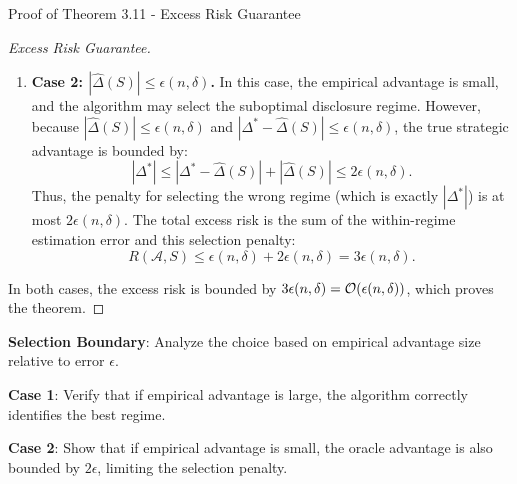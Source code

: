 \begin{sourceblock}{Proof of Theorem 3.11 - Excess Risk Guarantee}
\begin{proof}[Excess Risk Guarantee]
\begin{enumerate}
    \begin{equation}
        R(\mathcal{A}, S) \le \epsilon(n, \delta).
    \end{equation}
    \item \textbf{Case 2: $|\hat{\Delta}(S)| \le \epsilon(n, \delta)$.}
    In this case, the empirical advantage is small, and the algorithm may select the suboptimal disclosure regime. However, because $|\hat{\Delta}(S)| \le \epsilon(n, \delta)$ and $|\Delta^* - \hat{\Delta}(S)| \le \epsilon(n, \delta)$, the true strategic advantage is bounded by:
    \begin{equation}
        |\Delta^*| \le |\Delta^* - \hat{\Delta}(S)| + |\hat{\Delta}(S)| \le 2\epsilon(n, \delta).
    \end{equation}
    Thus, the penalty for selecting the wrong regime (which is exactly $|\Delta^*|$) is at most $2\epsilon(n, \delta)$. The total excess risk is the sum of the within-regime estimation error and this selection penalty:
    \begin{equation}
        R(\mathcal{A}, S) \le \epsilon(n, \delta) + 2\epsilon(n, \delta) = 3\epsilon(n, \delta).
    \end{equation}
\end{enumerate}
In both cases, the excess risk is bounded by $3\epsilon(n, \delta) = \mathcal{O}(\epsilon(n, \delta))$, which proves the theorem.
\end{proof}
\end{sourceblock}

\begin{guideblock}
\item \textbf{Selection Boundary}: Analyze the choice based on empirical advantage size relative to error $\epsilon$.
\item \textbf{Case 1}: Verify that if empirical advantage is large, the algorithm correctly identifies the best regime.
\item \textbf{Case 2}: Show that if empirical advantage is small, the oracle advantage is also bounded by $2\epsilon$, limiting the selection penalty.
\end{guideblock}



